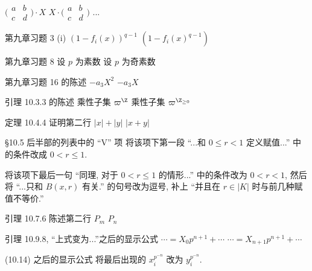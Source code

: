 \documentclass{AJerrata}
\begin{document}
\begin{Errata}
		\Orig $\bigl( \begin{smallmatrix} a & b \\ c & d \end{smallmatrix} \bigr) \cdot X$
		\Corr $X \cdot \bigl( \begin{smallmatrix} a & b \\ c & d \end{smallmatrix} \bigr)$ ...
		
		\item[第九章习题 3 (i)]
		\Orig $\left( 1 - f_i(x) \right)^{q-1}$
		\Corr $\left( 1 - f_i(x)^{q-1} \right)$
		
		\item[第九章习题 8]
		\Orig 设 $p$ 为素数
		\Corr 设 $p$ 为奇素数
		
		\item[第九章习题 16 的陈述]
		\Orig $-a_3 X^2$
		\Corr $-a_3 X$
		
		\item[引理 10.3.3 的陈述]
		\Orig 乘性子集 $\varpi^\Z$
		\Corr 乘性子集 $\varpi^{\Z_{\geq 0}}$
		
		\item[定理 10.4.4 证明第二行]
		\Orig $|x|+|y|$
		\Corr $|x+y|$
		
		\item[\S 10.5 后半部的列表中的 ``V'' 项]
		将该项下第一段 ``...和 $0 \leq r < 1$ 定义赋值...'' 中的条件改成 $0 < r \leq 1$.
		
		将该项下最后一句 ``同理, 对于 $0 < r \leq 1$ 的情形...'' 中的条件改为 $0 < r < 1$, 然后将 ``...只和 $B(x, r)$ 有关.'' 的句号改为逗号, 补上 ``并且在 $r \in |K|$ 时与前几种赋值不等价.''
		
		\item[引理 10.7.6 陈述第二行]
		\Orig $P_m$
		\Corr $P_n$
		
		\item[引理 10.9.8, ``上式变为...''之后的显示公式]
		\Orig $\cdots = X_0 p^{n+1} + \cdots$
		\Corr $\cdots = X_{n+1} p^{n+1} + \cdots$
		
		\item[(10.14) 之后的显示公式]
		将最后出现的 $x_i^{p^{-n}}$ 改为 $y_i^{p^{-n}}$.
	\end{Errata}
\end{document}
